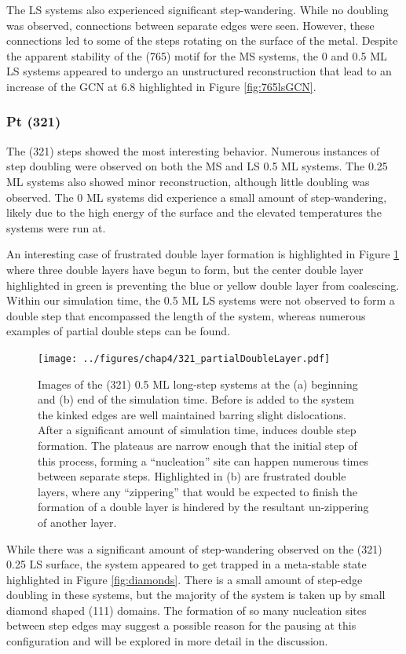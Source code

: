 The LS systems also experienced significant step-wandering. While no doubling
was observed, connections between separate edges were seen. However, these
connections led to some of the steps rotating on the surface of the metal.
Despite the apparent stability of the (765) motif for the MS systems, the 0 and
0.5 ML LS systems appeared to undergo an unstructured reconstruction that lead
to an increase of the GCN at 6.8 highlighted in Figure \ref{fig:765lsGCN}.

\subsubsection{Pt (321)}
The (321) steps showed the most interesting behavior. Numerous instances of
step doubling were observed on both the MS and LS 0.5 ML systems. The 0.25 ML
systems also showed minor reconstruction, although little doubling
was observed. The 0 ML systems did experience a small amount of step-wandering,
likely due to the high energy of the surface and the elevated temperatures the
systems were run at.

An interesting case of frustrated double layer formation is highlighted in
Figure \ref{fig:partialDoubleLayer} where three double layers have begun to
form, but the center double layer highlighted in green is preventing the blue
or yellow double layer from coalescing. Within our simulation time, the 0.5 ML
LS systems were not observed to form a double step that encompassed the length
of the system, whereas numerous examples of partial double steps can be found.

\begin{figure}
\centering
\texttt{[image: ../figures/chap4/321\_partialDoubleLayer.pdf]}
\caption{Images of the (321) 0.5 ML long-step systems at the (a) beginning and
(b) end of the simulation time. Before  is added to the system the
kinked edges are well maintained barring slight dislocations. After a
significant amount of simulation time,  induces double step formation.
The plateaus are narrow enough that the initial step of this process, forming a
``nucleation'' site can happen numerous times between separate steps.
Highlighted in (b) are frustrated double layers, where any ``zippering'' that
would be expected to finish the formation of a double layer is hindered by the
resultant un-zippering of another layer.}
\label{fig:partialDoubleLayer}
\end{figure}

While there was a significant amount of step-wandering observed on the (321)
0.25 LS surface, the system appeared to get trapped in a meta-stable state
highlighted in Figure \ref{fig:diamonds}. There is a small amount of step-edge
doubling in these systems, but the majority of the system is taken up by small
diamond shaped (111) domains. The formation of so many nucleation sites between
step edges may suggest a possible reason for the pausing at this configuration
and will be explored in more detail in the discussion.

